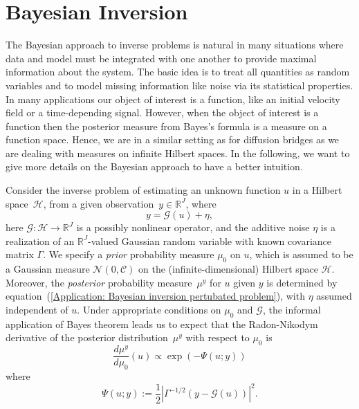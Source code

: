 \section{Bayesian Inversion}

The Bayesian approach to inverse problems is natural in many situations where data and model must be integrated with one another to provide maximal information about the system. The basic idea is to treat all quantities as random variables and to model missing information like noise via its statistical properties. In many applications our object of interest is a function, like an initial velocity field or a time-depending signal. However, when the object of interest is a function then the posterior measure from Bayes’s formula is a measure on a function space. Hence, we are in a similar setting as for diffusion bridges as we are dealing with measures on infinite Hilbert spaces.  In the following, we want to give more details on the Bayesian approach to have a better intuition.


Consider the inverse problem of estimating an unknown function $u$ in a Hilbert space~$\mathcal{H}$, from a given observation~$y \in \mathbb{R}^J$, where
 \begin{equation}
  \label{Application: Bayesian inversion pertubated problem}
  y = \mathcal{G}(u) + \eta,
\end{equation}
here $\mathcal{G}: \mathcal{H} \to \mathbb{R}^J$ is a possibly nonlinear operator, and the additive noise $\eta$ is a realization of an $\mathbb{R}^J$-valued Gaussian random variable with known covariance matrix $\Gamma$. We specify a \textit{prior} probability measure $\mu_0$  on $u$, which is assumed to be a Gaussian measure $ \mathcal{N}(0, \mathcal{C}) $ on the (infinite-dimensional) Hilbert space $\mathcal{H}$. Moreover, the \textit{posterior} probability measure~$\mu^y$ for $u$ given $y$ is determined by equation~(\ref{Application: Bayesian inversion pertubated problem}), with $\eta$ assumed independent of $u$. Under appropriate conditions on $\mu_0$ and $\mathcal{G}$, the informal application of Bayes theorem leads us to expect that the Radon-Nikodym derivative of the posterior distribution~$\mu^y$ with respect to $\mu_0$ is
\begin{equation}
 \frac{d \mu^y}{d \mu_0}(u) \varpropto \exp (- \Psi(u; y))
\end{equation}
where
\begin{equation}
 \Psi (u;y) := \frac{1}{2} \left| \Gamma^{-1/2} (y- \mathcal{G}(u)) \right|^2.
\end{equation}

